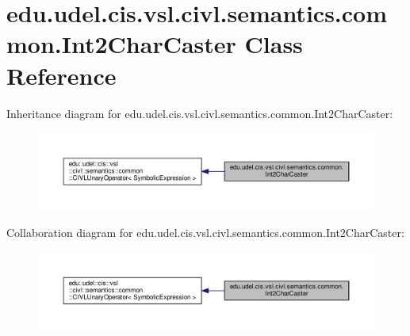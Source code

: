 \hypertarget{classedu_1_1udel_1_1cis_1_1vsl_1_1civl_1_1semantics_1_1common_1_1Int2CharCaster}{}\section{edu.\+udel.\+cis.\+vsl.\+civl.\+semantics.\+common.\+Int2\+Char\+Caster Class Reference}
\label{classedu_1_1udel_1_1cis_1_1vsl_1_1civl_1_1semantics_1_1common_1_1Int2CharCaster}


Inheritance diagram for edu.\+udel.\+cis.\+vsl.\+civl.\+semantics.\+common.\+Int2\+Char\+Caster\+:
\nopagebreak
\begin{figure}[H]
\begin{center}
\leavevmode
\includegraphics[width=350pt]{classedu_1_1udel_1_1cis_1_1vsl_1_1civl_1_1semantics_1_1common_1_1Int2CharCaster__inherit__graph}
\end{center}
\end{figure}


Collaboration diagram for edu.\+udel.\+cis.\+vsl.\+civl.\+semantics.\+common.\+Int2\+Char\+Caster\+:
\nopagebreak
\begin{figure}[H]
\begin{center}
\leavevmode
\includegraphics[width=350pt]{classedu_1_1udel_1_1cis_1_1vsl_1_1civl_1_1semantics_1_1common_1_1Int2CharCaster__coll__graph}
\end{center}
\end{figure}
